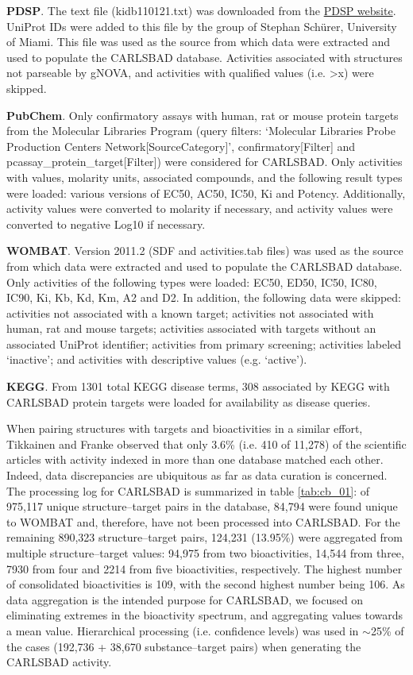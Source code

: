 \textbf{PDSP}. The text file (kidb110121.txt) was downloaded from the \href{http://pdsp.med.unc.edu/indexR.html}{PDSP website}. UniProt IDs were added to this file by the group of Stephan Sch\"{u}rer, University of Miami. This file was used as the source from which data were extracted and used to populate the CARLSBAD database. Activities associated with structures not parseable by gNOVA, and activities with qualified values (i.e. \textgreater x) were skipped.

\textbf{PubChem}. Only confirmatory assays with human, rat or mouse protein targets from the Molecular Libraries Program (query filters: ‘Molecular Libraries Probe Production Centers Network[SourceCategory]’, confirmatory[Filter] and pcassay\_protein\_target[Filter]) were considered for CARLSBAD. Only activities with values, molarity units, associated compounds, and the following result types were loaded: various versions of EC50, AC50, IC50, Ki and Potency. Additionally, activity values were converted to molarity if necessary, and activity values were converted to negative Log10 if necessary.

\textbf{WOMBAT}. Version 2011.2 (SDF and activities.tab files) was used as the source from which data were extracted and used to populate the CARLSBAD database. Only activities of the following types were loaded: EC50, ED50, IC50, IC80, IC90, Ki, Kb, Kd, Km, A2 and D2. In addition, the following data were skipped: activities not associated with a known target; activities not associated with human, rat and mouse targets; activities associated with targets without an associated UniProt identifier; activities from primary screening; activities labeled ‘inactive’; and activities with descriptive values (e.g. ‘active’).

\textbf{KEGG}. From 1301 total KEGG disease terms, 308 associated by KEGG with CARLSBAD protein targets were loaded for availability as disease queries.

When pairing structures with targets and bioactivities in a similar effort, Tikkainen and Franke observed that only 3.6\% (i.e. 410 of 11,278) of the scientific articles with activity indexed in more than one database matched each other. Indeed, data discrepancies are ubiquitous as far as data curation is concerned\cite{Tiikkainen2012-cw}. The processing log for CARLSBAD is summarized in table \ref{tab:cb_01}: of 975,117 unique structure–target pairs in the database, 84,794 were found unique to WOMBAT and, therefore, have not been processed into CARLSBAD. For the remaining 890,323 structure–target pairs, 124,231 (13.95\%) were aggregated from multiple structure–target values: 94,975 from two bioactivities, 14,544 from three, 7930 from four and 2214 from five bioactivities, respectively. The highest number of consolidated bioactivities is 109, with the second highest number being 106. As data aggregation is the intended purpose for CARLSBAD, we focused on eliminating extremes in the bioactivity spectrum, and aggregating values towards a mean value. Hierarchical processing (i.e. confidence levels) was used in $\sim$25\% of the cases (192,736 + 38,670 substance–target pairs) when generating the CARLSBAD activity.

